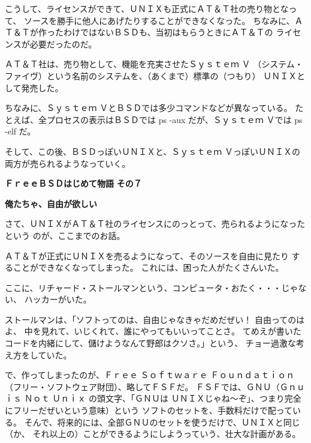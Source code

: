 \documentclass[12pt]{jarticle}
\begin{document}
\bigskip

こうして、ライセンスができて、ＵＮＩＸも正式にＡＴ＆Ｔ社の売り物となって、
ソースを勝手に他人にあげたりすることができなくなった。
ちなみに、ＡＴ＆Ｔが作ったわけではないＢＳＤも、当初はもらうときにＡＴ＆Ｔの
ライセンスが必要だったのだ。

\bigskip

ＡＴ＆Ｔ社は、売り物として、機能を充実させたＳｙｓｔｅｍ Ｖ
（システム・ファイヴ）という名前のシステムを、（あくまで）標準の（つもり）
ＵＮＩＸとして発売した。

ちなみに、Ｓｙｓｔｅｍ ＶとＢＳＤでは多少コマンドなどが異なっている。
たとえば、全プロセスの表示はＢＳＤでは ps -aux だが、Ｓｙｓｔｅｍ Ｖでは
 ps -elf だ。

そして、この後、ＢＳＤっぽいＵＮＩＸと、Ｓｙｓｔｅｍ ＶっぽいＵＮＩＸの
両方が売られるようなっていく。
\newpage

\noindent
\textbf{\Huge ＦｒｅｅＢＳＤはじめて物語}
\hspace{1cm}
\textbf{\LARGE その７}

\bigskip

\textbf{\large 俺たちゃ、自由が欲しい}

\bigskip
\bigskip

さて、ＵＮＩＸがＡＴ＆Ｔ社のライセンスにのっとって、売られるようになったという
のが、ここまでのお話。

\bigskip

ＡＴ＆Ｔが正式にＵＮＩＸを売るようになって、そのソースを自由に見たり
することができなくなってしまった。
これには、困った人がたくさんいた。

\bigskip

ここに、リチャード・ストールマンという、コンピュータ・おたく・・・じゃない、
ハッカーがいた。

\bigskip

ストールマンは、「ソフトってのは、自由じゃなきゃだめだぜい！ 自由ってのはよ、
中を見れて、いじくれて、誰にやってもいいってことさ。
てめえが書いたコードを内緒にして、儲けようなんて野郎はクソさ。」という、
チョー過激な考え方をしていた。

で、作ってしまったのが、Ｆｒｅｅ Ｓｏｆｔｗａｒｅ Ｆｏｕｎｄａｔｉｏｎ
（フリー・ソフトウェア財団）、略してＦＳＦだ。
ＦＳＦでは、ＧＮＵ（Ｇｎｕ ｉｓ Ｎｏｔ Ｕｎｉｘ の頭文字、「ＧＮＵは
ＵＮＩＸじゃね〜ぞ」、つまり完全にフリーだぜいという意味）という
ソフトのセットを、手数料だけで配っている。
そんで、将来的には、全部ＧＮＵのセットを使うだけで、ＵＮＩＸと同じ（か、
それ以上の）ことができるようにしようっていう、壮大な計画がある。
\end{document}
